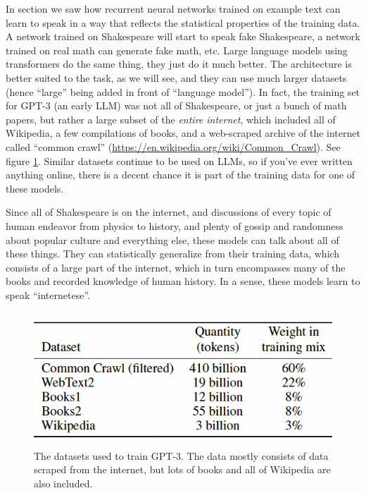 In section  we saw how recurrent neural networks trained on example text can learn to speak in a way that reflects the statistical properties of the training data. A network trained on Shakespeare will start to speak fake Shakespeare, a network trained on real math can generate fake math, etc. Large language models using transformers do the same thing, they just do it much better. The architecture is better suited to the task, as we will see, and they can use much larger datasets (hence ``large'' being added in front of ``language model''). In fact, the training set for GPT-3 (an early LLM) was not all of Shakespeare, or just a bunch of math papers, but rather a large subset of the \emph{entire internet}, which included all of Wikipedia, a few compilations of books, and a web-scraped archive of the internet called ``common crawl'' (\url{https://en.wikipedia.org/wiki/Common_Crawl}). See figure \ref{gptDatasets}. Similar datasets continue to be used on LLMs, so if you've ever written anything online, there is a decent chance it is part of the training data for one of these models. 

Since all of Shakespeare is on the internet, and discussions of every topic of human endeavor from physics to history, and plenty of gossip and randomness about popular culture and everything else, these models can talk about all of these things. They can statistically generalize from their training data, which consists of a large part of the internet, which in turn encompasses many of the books and recorded knowledge of human history. In a sense, these models learn to speak ``internetese''. 

\begin{figure}[h]
\centering
\includegraphics[scale=.4]{./images/gptDatasets}
\caption[From \cite{brown2020language}.]{The datasets used to train GPT-3. The data mostly consists of data scraped from the internet, but lots of books and all of Wikipedia are also included.}
\label{gptDatasets}
\end{figure}

